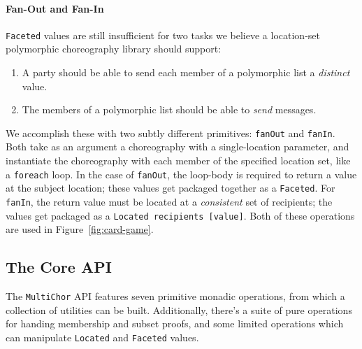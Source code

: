 \documentclass[sigplan,screen,review,anonymous]{acmart}
\newcommand{\inlinecode}[2][haskell]{\texttt{#2}}
\newcommand{\MultiChor}{\texttt{Multi\-Chor}\xspace}
\begin{document}
\paragraph{Fan-Out and Fan-In}
\inlinecode{Faceted} values are still insufficient for two tasks we believe a location-set polymorphic
choreography library should support:
\begin{enumerate}[leftmargin=12pt, itemsep=0pt]
\item A party should be able to send each member of a polymorphic list a \emph{distinct} value.
\item The members of a polymorphic list should be able to \emph{send} messages.
\end{enumerate}
We accomplish these with two subtly different primitives:
\inlinecode{fanOut} and \inlinecode{fanIn}.
Both take as an argument a choreography with a single-location parameter,
and instantiate the choreography with each member of the specified location set,
like a \inlinecode[text]{foreach} loop.
In the case of \inlinecode{fanOut}, the loop-body is required to return a value at the subject 
location;
these values get packaged together as a \inlinecode{Faceted}.
For \inlinecode{fanIn}, the return value must be located at a \emph{consistent} set of recipients;
the values get packaged as a \inlinecode{Located recipients [value]}.
Both of these operations are used in Figure~\ref{fig:card-game}.


\subsection{The Core API}\label{sec:monad}

The \MultiChor API features seven primitive monadic operations,
from which a collection of utilities can be built.
Additionally, there's a suite of pure operations for handing membership and subset proofs,
and some limited operations which can manipulate \inlinecode{Located}
and \inlinecode{Faceted} values.
\end{document}
